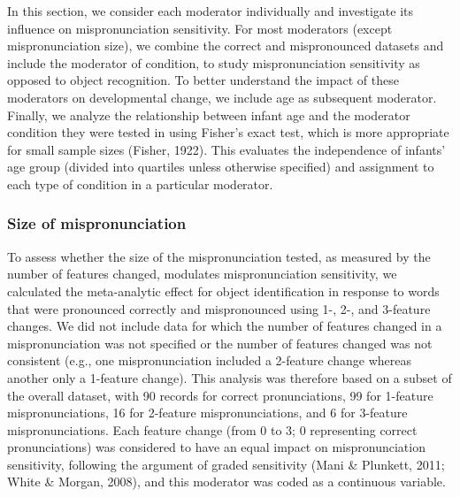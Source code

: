 \documentclass[man]{apa6}
\begin{document}
In this section, we consider each moderator individually and investigate its influence on mispronunciation sensitivity. For most moderators (except mispronunciation size), we combine the correct and mispronounced datasets and include the moderator of condition, to study mispronunciation sensitivity as opposed to object recognition. To better understand the impact of these moderators on developmental change, we include age as subsequent moderator. Finally, we analyze the relationship between infant age and the moderator condition they were tested in using Fisher's exact test, which is more appropriate for small sample sizes (Fisher, 1922). This evaluates the independence of infants' age group (divided into quartiles unless otherwise specified) and assignment to each type of condition in a particular moderator.

\hypertarget{size-of-mispronunciation}{%
\subsubsection{Size of mispronunciation}\label{size-of-mispronunciation}}

To assess whether the size of the mispronunciation tested, as measured by the number of features changed, modulates mispronunciation sensitivity, we calculated the meta-analytic effect for object identification in response to words that were pronounced correctly and mispronounced using 1-, 2-, and 3-feature changes. We did not include data for which the number of features changed in a mispronunciation was not specified or the number of features changed was not consistent (e.g., one mispronunciation included a 2-feature change whereas another only a 1-feature change). This analysis was therefore based on a subset of the overall dataset, with 90 records for correct pronunciations, 99 for 1-feature mispronunciations, 16 for 2-feature mispronunciations, and 6 for 3-feature mispronunciations. Each feature change (from 0 to 3; 0 representing correct pronunciations) was considered to have an equal impact on mispronunciation sensitivity, following the argument of graded sensitivity (Mani \& Plunkett, 2011; White \& Morgan, 2008), and this moderator was coded as a continuous variable.
\end{document}
